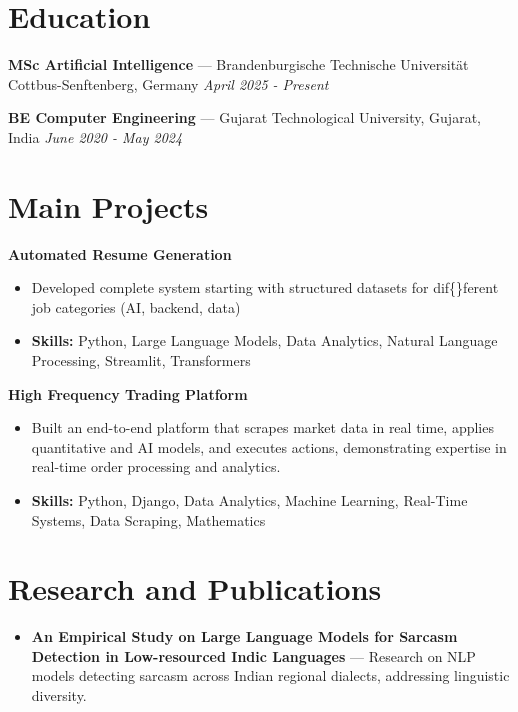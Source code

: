 \documentclass[a4paper,10pt]{article}
\begin{document}
\section*{Education}
\textbf{MSc Artificial Intelligence} — Brandenburgische Technische Universität Cottbus-Senftenberg, Germany \hfill \textit{April 2025 - Present}\par
\vspace{1.5pt}
\textbf{BE Computer Engineering} — Gujarat Technological University, Gujarat, India \hfill \textit{June 2020 - May 2024}\par

\section*{Main Projects}
\textbf{Automated Resume Generation}\par
\vspace{1pt}
\begin{itemize}
  \item Developed complete system starting with structured datasets for dif\{\}ferent job categories (AI, backend, data)
  \item \textbf{Skills:} Python, Large Language Models, Data Analytics, Natural Language Processing, Streamlit, Transformers
\end{itemize}
\vspace{3pt}
\textbf{High Frequency Trading Platform}\par
\vspace{1pt}
\begin{itemize}
  \item Built an end-to-end platform that scrapes market data in real time, applies quantitative and AI models, and executes actions, demonstrating expertise in real-time order processing and analytics.
  \item \textbf{Skills:} Python, Django, Data Analytics, Machine Learning, Real-Time Systems, Data Scraping, Mathematics
\end{itemize}

\section*{Research and Publications}
\begin{itemize}
\item \textbf{An Empirical Study on Large Language Models for Sarcasm Detection in Low-resourced Indic Languages} — Research on NLP models detecting sarcasm across Indian regional dialects, addressing linguistic diversity.
\end{itemize}
\end{document}
